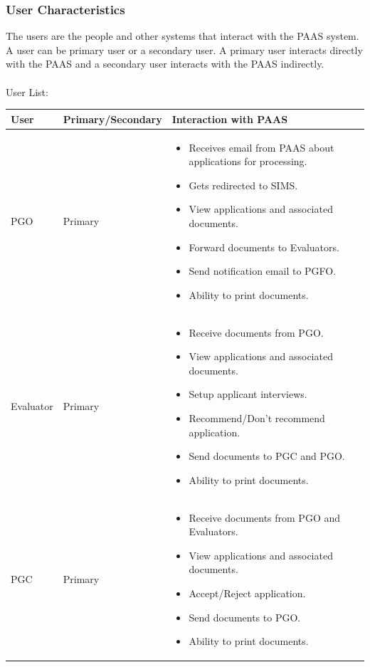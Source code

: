 \documentclass{article}
\begin{document}
\subsubsection{User Characteristics}
The users are the people and other systems that interact with the PAAS system. A user can be primary user or a secondary user. A primary user interacts directly with the PAAS and a secondary user interacts with the PAAS indirectly. \\ \\
User List: \\
\begin{tabular} {| m{1.5cm} | m{3.5cm} | m{9.5cm} |}
\hline
\textbf{User} & \textbf{Primary/Secondary} & \textbf{Interaction with PAAS} \\
\hline
PGO & Primary & \begin{itemize} \itemsep0em
\item Receives email from PAAS about applications for processing.
\item Gets redirected to SIMS.
\item View applications and associated documents.
\item Forward documents to Evaluators.
\item Send notification email to PGFO.
\item Ability to print documents. 
\end{itemize} \\
\hline
Evaluator & Primary & \begin{itemize} \itemsep0em
\item Receive documents from PGO.
\item View applications and associated documents.
\item Setup applicant interviews.
\item Recommend/Don't recommend application.
\item Send documents to PGC and PGO.
\item Ability to print documents.
\end{itemize} \\
\hline
PGC & Primary & \begin{itemize} \itemsep0em
\item Receive documents from PGO and Evaluators.
\item View applications and associated documents.
\item Accept/Reject application.
\item Send documents to PGO.
\item Ability to print documents.

\end{itemize}
\end{tabular}
\end{document}
